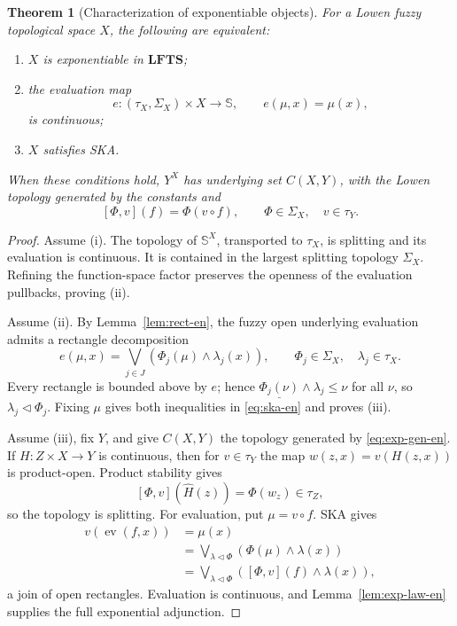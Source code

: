 \documentclass[11pt,a4paper]{article}
\numberwithin{equation}{section}
\newtheorem{theorem}{Theorem}[section]
\theoremstyle{definition}
\theoremstyle{remark}
\newcommand{\Sier}{\mathbb S}
\newcommand{\LFTS}{\mathbf{LFTS}}
\newcommand{\const}[1]{\underline{#1}}
\newcommand{\ev}{\operatorname{ev}}
\begin{document}
\begin{theorem}[Characterization of exponentiable objects]
\label{thm:main-en}
For a Lowen fuzzy topological space \(X\), the following are equivalent:
\begin{enumerate}[label=(\roman*)]
 \item \(X\) is exponentiable in \(\LFTS\);
 \item the evaluation map
 \[
 e:(\tau_X,\Sigma_X)\times X\to\Sier,
 \qquad e(\mu,x)=\mu(x),
 \]
 is continuous;
 \item \(X\) satisfies SKA.
\end{enumerate}
When these conditions hold, \(Y^X\) has underlying set \(C(X,Y)\),
with the Lowen topology generated by the constants and
\begin{equation}\label{eq:exp-gen-en}
 [\Phi,v](f)=\Phi(v\circ f),
 \qquad \Phi\in\Sigma_X,\quad v\in\tau_Y.
\end{equation}
\end{theorem}

\begin{proof}
Assume (i).  The topology of \(\Sier^X\), transported to \(\tau_X\),
is splitting and its evaluation is continuous.  It is contained in the
largest splitting topology \(\Sigma_X\).  Refining the function-space
factor preserves the openness of the evaluation pullbacks, proving (ii).

Assume (ii).  By Lemma~\ref{lem:rect-en}, the fuzzy open underlying
evaluation admits a rectangle decomposition
\[
 e(\mu,x)=\bigvee_{j\in J}
       (\Phi_j(\mu)\wedge\lambda_j(x)),
 \qquad \Phi_j\in\Sigma_X,\quad\lambda_j\in\tau_X.
\]
Every rectangle is bounded above by \(e\); hence
\(\const{\Phi_j(\nu)}\wedge\lambda_j\leq\nu\) for all \(\nu\), so
\(\lambda_j\triangleleft\Phi_j\).  Fixing \(\mu\) gives both inequalities
in \eqref{eq:ska-en} and proves (iii).

Assume (iii), fix \(Y\), and give \(C(X,Y)\) the topology generated by
\eqref{eq:exp-gen-en}.  If \(H:Z\times X\to Y\) is continuous, then for
\(v\in\tau_Y\) the map \(w(z,x)=v(H(z,x))\) is product-open.  Product
stability gives
\[
 [\Phi,v](\widehat H(z))=\Phi(w_z)\in\tau_Z,
\]
so the topology is splitting.  For evaluation, put \(\mu=v\circ f\).
SKA gives
\begin{align*}
 v(\ev(f,x))
 &=\mu(x)\\
 &=\bigvee_{\lambda\triangleleft\Phi}
   (\Phi(\mu)\wedge\lambda(x))\\
 &=\bigvee_{\lambda\triangleleft\Phi}
   ([\Phi,v](f)\wedge\lambda(x)),
\end{align*}
a join of open rectangles.  Evaluation is continuous, and
Lemma~\ref{lem:exp-law-en} supplies the full exponential adjunction.
\end{proof}
\end{document}
